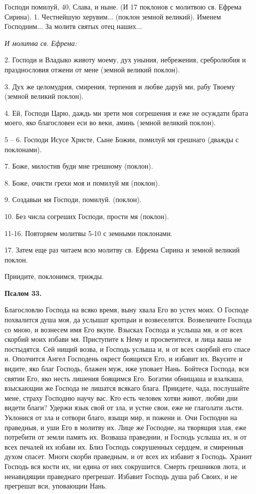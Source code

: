 Господи помилуй, 40, Слава, и ныне. (И 17 поклонов с молитвою св. Ефрема Сирина). 1. Честнейшую херувим... (поклон земной великий). Именем Господним... За молитв святых отец наших...


\itshape И молитва св. Ефрема:\normalfont{}


2. Господи и Владыко животу моему, дух уныния, небрежения, сребролюбия и празднословия отжени от мене (земной великий поклон).


3. Дух же целомудрия, смирения, терпения и любве даруй ми, рабу Твоему (земной великий поклон).


4. Ей, Господи Царю, даждь ми зрети моя согрешения и еже не осуждати брата моего, яко благословен еси во веки, аминь (земной великий поклон).


5 – 6. Господи Исусе Христе, Сыне Божии, помилуй мя грешнаго (дважды с поклонами).

7. Боже, милостив буди мне грешному (поклон).


8. Боже, очисти грехи моя и помилуй мя (поклон).


9. Создавыи мя Господи, помилуй. (поклон).


10. Без числа согреших Господи, прости мя (поклон).


11-16. Повторяем молитвы 5-10 с земными поклонами.


17. Затем еще раз читаем всю молитву св. Ефрема Сирина и земной великий поклон.


Приидите, поклонимся, трижды.


\medskip


\bfseries Псалом 33.\normalfont{}


Благословлю Господа на всяко время, выну хвала Его во устех моих. О Господе похвалится душа моя, да услышат кротцыи и возвеселятся. Возвеличите Господа со мною, и вознесем имя Его вкупе. Взысках Господа и услыша мя, и от всех скорбий моих избави мя. Приступите к Нему и просветитеся, и лица ваша не постыдятся. Сей нищий возва, и Господь услыша и, и от всех скорбий его спасе и. Ополчится Ангел Господень окрест боящихся Его, и избавит их. Вкусите и видите, яко благ Господь, блажен муж, иже уповает Нань. Бойтеся Господа, вси святии Его, яко несть лишения боящимся Его. Богатии обнищаша и взалкаша, взыскающии же Господа не лишатся всякаго блага. Приидете, чада, послушайте мене, страху Господню научу вас. Кто есть человек хотяи живот, любяи дни видети благи? Удержи язык свой от зла, и устне свои, еже не глаголати льсти. Уклонися от зла и сотвори благо, взыщи мир, и пожени и. Очи Господни на праведныя, и уши Его в молитву их. Лице же Господне, на творящия злая, еже потребити от земли память их. Возваша праведнии, и Господь услыша их, и от всех печалей их избави их. Близ Господь сокрушенных сердцем, и смиренныя духом спасет. Многи скорби праведным, и от всех их избавит я Господь. Хранит Господь вся кости их, ни едина от них сокрушится. Смерть грешников люта, и ненавидящии праведнаго прегрешат. Избавит Господь душа раб Своих, и не прегрешат вси, уповающии Нань.


